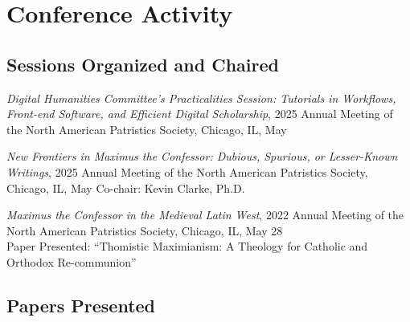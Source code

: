 \documentclass[letterpaper,12pt]{article}
\newcommand{\years}[1]{%
  {\reversemarginpar\strut\marginnote{{\small#1}}}%
}
\begin{document}
{{{{{{{{\section*{Conference Activity}

\subsection*{Sessions Organized and Chaired}


\years{2025}%
%
\emph{Digital Humanities Committee's Practicalities Session: Tutorials in Workflows, Front-end Software, and Efficient Digital Scholarship}, 2025 Annual Meeting of the North American Patristics Society, Chicago, IL, May \\ [.3cm]
%
\years{2025}%
%
\emph{New Frontiers in Maximus the Confessor: Dubious, Spurious, or Lesser-Known Writings}, 2025 Annual Meeting of the North American Patristics Society, Chicago, IL, May Co-chair: Kevin Clarke, Ph.D. \\ [.3cm]
%
\years{2022}%
%
\emph{Maximus the Confessor in the Medieval Latin West}, 2022 Annual Meeting of the North American Patristics Society, Chicago, IL, May 28\\
Paper Presented: ``Thomistic Maximianism: A Theology for Catholic and Orthodox Re-communion'' \\

\subsection*{Papers Presented}

}}}}}}}}
\end{document}
